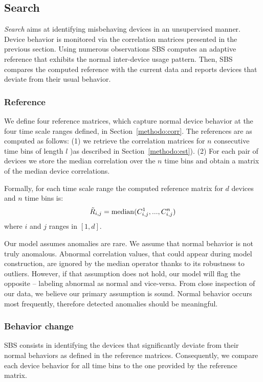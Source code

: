 \subsection{Search}\label{methodo:ano}
\emph{Search} aims at identifying misbehaving devices in an unsupervised manner.
Device behavior is monitored via the correlation matrices presented in the previous section.
Using numerous observations SBS computes an adaptive reference that exhibits the normal inter-device usage pattern.
Then, SBS compares the computed reference with the current data and reports devices that deviate from their usual 
behavior.

\subsubsection{Reference}
We define four reference matrices, which capture normal device behavior at the four time scale ranges defined, in 
Section~\ref{methodo:corr}.
The references are as computed as follows: (1) we retrieve the correlation matrices for $n$ consecutive time bins of 
length $l$ )as described in Section~\ref{methodo:est}). (2) For each pair of devices we store the median correlation 
over the $n$ time bins and obtain a matrix of the median device correlations.

Formally, for each time scale range the computed reference matrix for $d$ devices and $n$ time bins is:
\[\tilde{R}_{i,j} =  \operatorname{median}(C^1_{i,j},...,C^n_{i,j})\]
where $i$ and $j$ ranges in $[1,d]$.

Our model assumes anomalies are rare.  We assume that normal behavior is not truly anomalous.
Abnormal correlation values, that could appear during model construction, %
are ignored by the median operator thanks to its robustness to outliers.  However, if that assumption does not hold, 
 our model will flag the opposite -- labeling abnormal as normal and vice-versa.
From close inspection of our data, we believe our primary assumption is sound.  Normal behavior occurs
most frequently, therefore detected anomalies should be meaningful.



\subsubsection{Behavior change}
SBS consists in identifying the devices that significantly deviate from their normal behaviors as defined in the reference matrices.
Consequently, we compare each device behavior for all time bins to the one provided by the reference matrix.

